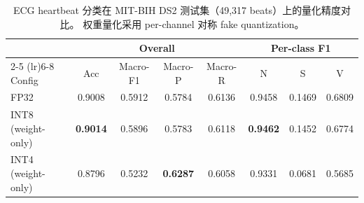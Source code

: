 %
%

\begin{table}[t]
\centering
\caption{ECG heartbeat 分类在 MIT-BIH DS2 测试集（49{,}317 beats）上的量化精度对比。
权重量化采用 per-channel 对称 fake quantization。}
\label{tab:quant-summary}
\begin{tabular}{lcccc|ccc}
\toprule
 & \multicolumn{4}{c|}{Overall} & \multicolumn{3}{c}{Per-class F1} \\
\cmidrule(lr){2-5} \cmidrule(lr){6-8}
Config & Acc & Macro-F1 & Macro-P & Macro-R & N & S & V \\
\midrule
FP32                 & 0.9008 & 0.5912 & 0.5784 & 0.6136 & 0.9458 & 0.1469 & 0.6809 \\
INT8 (weight-only)   & \textbf{0.9014} & 0.5896 & 0.5783 & 0.6118 & \textbf{0.9462} & 0.1452 & 0.6774 \\
INT4 (weight-only)   & 0.8796 & 0.5232 & \textbf{0.6287} & 0.6058 & 0.9331 & 0.0681 & 0.5685 \\
\bottomrule
\end{tabular}
\end{table}


